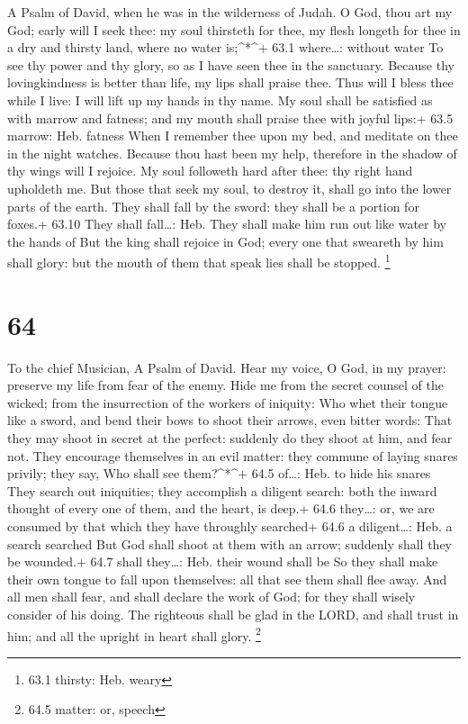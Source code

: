 A Psalm of David, when he was in the wilderness of Judah.  O
God, thou art my God; early will I seek thee: my soul thirsteth for
thee, my flesh longeth for thee in a dry and thirsty land, where no
water is;\^{}*\^{}+ 63.1 where\ldots: without water  To see
thy power and thy glory, so as I have seen thee in the sanctuary.
 Because thy lovingkindness is better than life, my lips
shall praise thee.  Thus will I bless thee while I live: I
will lift up my hands in thy name.  My soul shall be
satisfied as with marrow and fatness; and my mouth shall praise thee
with joyful lips:+ 63.5 marrow: Heb. fatness  When I
remember thee upon my bed, and meditate on thee in the night watches.
 Because thou hast been my help, therefore in the shadow of
thy wings will I rejoice.  My soul followeth hard after
thee: thy right hand upholdeth me.  But those that seek my
soul, to destroy it, shall go into the lower parts of the earth.
 They shall fall by the sword: they shall be a portion for
foxes.+ 63.10 They shall fall\ldots: Heb. They shall make him run out
like water by the hands of  But the king shall rejoice in
God; every one that sweareth by him shall glory: but the mouth of them
that speak lies shall be stopped. \footnote{63.1 thirsty: Heb. weary}

\hypertarget{section-63}{%
\section{64}\label{section-63}}

To the chief Musician, A Psalm of David.  Hear my voice, O
God, in my prayer: preserve my life from fear of the enemy. 
Hide me from the secret counsel of the wicked; from the insurrection of
the workers of iniquity:  Who whet their tongue like a
sword, and bend their bows to shoot their arrows, even bitter words:
 That they may shoot in secret at the perfect: suddenly do
they shoot at him, and fear not.  They encourage themselves
in an evil matter: they commune of laying snares privily; they say, Who
shall see them?\^{}*\^{}+ 64.5 of\ldots: Heb. to hide his snares
 They search out iniquities; they accomplish a diligent
search: both the inward thought of every one of them, and the heart, is
deep.+ 64.6 they\ldots: or, we are consumed by that which they have
throughly searched+ 64.6 a diligent\ldots: Heb. a search searched
 But God shall shoot at them with an arrow; suddenly shall
they be wounded.+ 64.7 shall they\ldots: Heb. their wound shall be
 So they shall make their own tongue to fall upon
themselves: all that see them shall flee away.  And all men
shall fear, and shall declare the work of God; for they shall wisely
consider of his doing.  The righteous shall be glad in the
LORD, and shall trust in him; and all the upright in heart shall glory.
\footnote{64.5 matter: or, speech}

